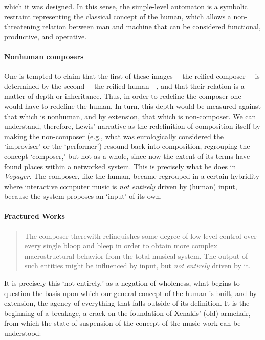 which it was designed. In this sense, the simple-level automaton is a symbolic restraint representing the classical concept of the human, which allows a non-threatening relation between man and machine that can be considered functional, productive, and operative.

\paragraph{Nonhuman composers}
One is tempted to claim that the first of these images ---the reified composer--- is determined by the second ---the reified human---, and that their relation is a matter of depth or inheritance. Thus, in order to redefine the composer one would have to redefine the human. In turn, this depth would be measured against that which is nonhuman, and by extension, that which is non-composer. We can understand, therefore, Lewis' narrative as the redefinition of composition itself by making the non-composer (e.g., what was eurologically considered the `improviser' or the `performer') resound back into composition, regrouping the concept `composer,' but not as a whole, since now the extent of its terms have found places within a networked system. This is precisely what he does in \textit{Voyager}. The composer, like the human, became regrouped in a certain hybridity where interactive computer music is \textit{not entirely} driven by (human) input, because the system proposes an `input' of its own. 

\paragraph{Fractured Works}

\begin{quote}
	The composer therewith relinquishes some degree of low-level control over every single bloop and bleep in order to obtain more complex macrostructural behavior from the total musical system. The output of such entities might be influenced by input, but \textit{not entirely} driven by it. \im \parencite[11]{Lew93:Put}
\end{quote}

It is precisely this `not entirely,' as a negation of wholeness, what begins to question the basis upon which our general concept of the human is built, and by extension, the agency of everything that falls outside of its definition. It is the beginning of a breakage, a crack on the foundation of Xenakis' (old) armchair, from which the state of suspension of the concept of the music work can be understood:

